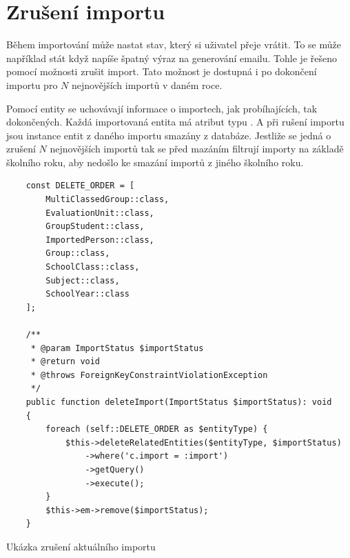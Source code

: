 \section{Zrušení importu}

Během importování může nastat stav, který si uživatel přeje vrátit.
To se může například stát když napíše špatný výraz na generování emailu.
Tohle je řešeno pomocí možnosti zrušit import.
Tato možnost je dostupná i po dokončení importu pro $N$ nejnovějších importů v daném roce.

Pomocí entity  se uchovávají informace o importech, jak probíhajících, tak dokončených.
Každá importovaná entita má atribut  typu  .
A při rušení importu jsou instance entit z daného importu smazány z databáze.
Jestliže se jedná o zrušení $N$ nejnovějších importů tak se před mazáním filtrují importy na základě školního roku, aby nedošlo ke smazání importů z jiného školního roku.


\begin{code}[H]

  \begin{verbatim}
    const DELETE_ORDER = [
        MultiClassedGroup::class,
        EvaluationUnit::class,
        GroupStudent::class,
        ImportedPerson::class,
        Group::class,
        SchoolClass::class,
        Subject::class,
        SchoolYear::class
    ];

    /**
     * @param ImportStatus $importStatus
     * @return void
     * @throws ForeignKeyConstraintViolationException
     */
    public function deleteImport(ImportStatus $importStatus): void
    {
        foreach (self::DELETE_ORDER as $entityType) {
            $this->deleteRelatedEntities($entityType, $importStatus)
                ->where('c.import = :import')
                ->getQuery()
                ->execute();
        }
        $this->em->remove($importStatus);
    }
  \end{verbatim}
  
  \caption{Ukázka zrušení aktuálního importu}

\end{code}
